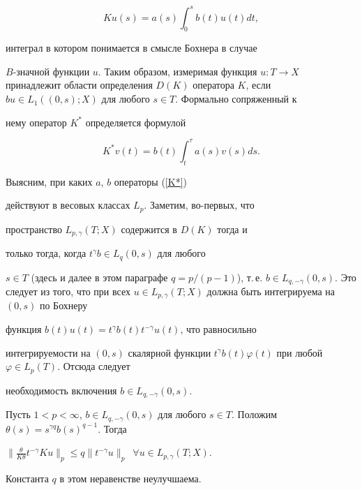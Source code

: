 \begin{equation}\label{K}


K u(s) = a(s) \int_0^s b(t) u(t) d t,


\end{equation}


интеграл в котором понимается в смысле Бохнера в случае


$B$-значной функции $u$. Таким образом, измеримая функция $u:T \to


X$ принадлежит области определения $D(K)$ оператора $K$, если $b u


\in L_1((0,s);X)$ для любого $s \in T$. Формально сопряженный к


нему оператор $K^*$ определяется формулой


\begin{equation}\label{K*}


K^* v(t) = b(t) \int_t^\tau a(s) v(s) d s.


\end{equation}


Выясним, при каких $a$, $b$ операторы (\ref{K*})


действуют в весовых классах $L_p$. Заметим, во-первых, что


пространство $L_{p,\gamma}(T;X)$ содержится в $D(K)$ тогда и


только тогда, когда $t^\gamma b \in L_q(0,s)$ для любого


$s \in T$ (здесь и далее в этом параграфе $q=p/(p-1)$), т.\,е. $b \in


L_{q,-\gamma}(0,s)$. Это следует из того, что при всех $u \in


L_{p,\gamma}(T;X)$ должна быть интегрируема на $(0,s)$ по Бохнеру


функция $b(t)u(t)=t^\gamma b(t) t^{-\gamma} u(t)$, что равносильно


интегрируемости на $(0,s)$ скалярной функции $t^\gamma


b(t)\varphi(t)$ при любой $\varphi \in L_p(T)$. Отсюда следует


необходимость включения $b \in L_{q,-\gamma}(0,s)$.





\begin{thms}\label{KonLp}


Пусть $1<p<\infty$, $b \in L_{q,-\gamma}(0,s)$ для любого $s \in


T$. Положим $\theta(s) =s^{\gamma q} b(s)^{q-1}$. Тогда


$\big\|\frac{\theta}{K \theta} t^{-\gamma} K u \big\|_p \le q


\|t^{-\gamma}u\|_p$\, $\forall u \in L_{p,\gamma}(T;X)$.


Константа $q$ в этом неравенстве неулучшаема.


\end{thms}






